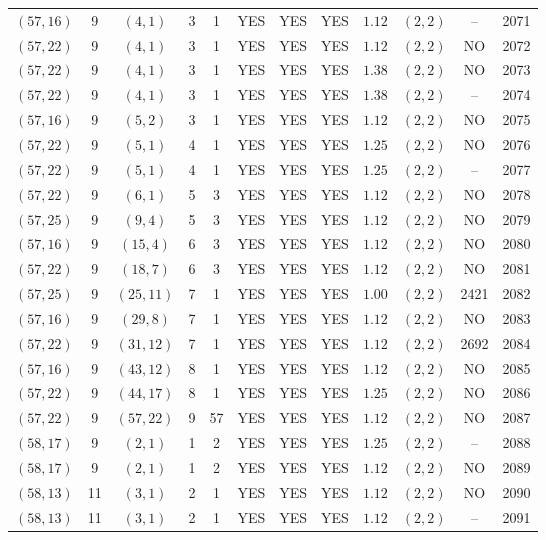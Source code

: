 \begin{longtable}{|c|c|c|c|c|c|c|c|c|c|c|c|}
$(57,16)$ & 9 & $(4,1)$ & 3 & 1 & YES & YES & YES & $1.12$ & $(2,2)$ & -- & 2071\\
$(57,22)$ & 9 & $(4,1)$ & 3 & 1 & YES & YES & YES & $1.12$ & $(2,2)$ & NO & 2072\\
$(57,22)$ & 9 & $(4,1)$ & 3 & 1 & YES & YES & YES & $1.38$ & $(2,2)$ & NO & 2073\\
$(57,22)$ & 9 & $(4,1)$ & 3 & 1 & YES & YES & YES & $1.38$ & $(2,2)$ & -- & 2074\\
$(57,16)$ & 9 & $(5,2)$ & 3 & 1 & YES & YES & YES & $1.12$ & $(2,2)$ & NO & 2075\\
$(57,22)$ & 9 & $(5,1)$ & 4 & 1 & YES & YES & YES & $1.25$ & $(2,2)$ & NO & 2076\\
$(57,22)$ & 9 & $(5,1)$ & 4 & 1 & YES & YES & YES & $1.25$ & $(2,2)$ & -- & 2077\\
$(57,22)$ & 9 & $(6,1)$ & 5 & 3 & YES & YES & YES & $1.12$ & $(2,2)$ & NO & 2078\\
$(57,25)$ & 9 & $(9,4)$ & 5 & 3 & YES & YES & YES & $1.12$ & $(2,2)$ & NO & 2079\\
$(57,16)$ & 9 & $(15,4)$ & 6 & 3 & YES & YES & YES & $1.12$ & $(2,2)$ & NO & 2080\\
$(57,22)$ & 9 & $(18,7)$ & 6 & 3 & YES & YES & YES & $1.12$ & $(2,2)$ & NO & 2081\\
$(57,25)$ & 9 & $(25,11)$ & 7 & 1 & YES & YES & YES & $1.00$ & $(2,2)$ & 2421 & 2082\\
$(57,16)$ & 9 & $(29,8)$ & 7 & 1 & YES & YES & YES & $1.12$ & $(2,2)$ & NO & 2083\\
$(57,22)$ & 9 & $(31,12)$ & 7 & 1 & YES & YES & YES & $1.12$ & $(2,2)$ & 2692 & 2084\\
$(57,16)$ & 9 & $(43,12)$ & 8 & 1 & YES & YES & YES & $1.12$ & $(2,2)$ & NO & 2085\\
$(57,22)$ & 9 & $(44,17)$ & 8 & 1 & YES & YES & YES & $1.25$ & $(2,2)$ & NO & 2086\\
$(57,22)$ & 9 & $(57,22)$ & 9 & 57 & YES & YES & YES & $1.12$ & $(2,2)$ & NO & 2087\\
$(58,17)$ & 9 & $(2,1)$ & 1 & 2 & YES & YES & YES & $1.25$ & $(2,2)$ & -- & 2088\\
$(58,17)$ & 9 & $(2,1)$ & 1 & 2 & YES & YES & YES & $1.12$ & $(2,2)$ & NO & 2089\\
$(58,13)$ & 11 & $(3,1)$ & 2 & 1 & YES & YES & YES & $1.12$ & $(2,2)$ & NO & 2090\\
$(58,13)$ & 11 & $(3,1)$ & 2 & 1 & YES & YES & YES & $1.12$ & $(2,2)$ & -- & 2091\\

\end{longtable}
